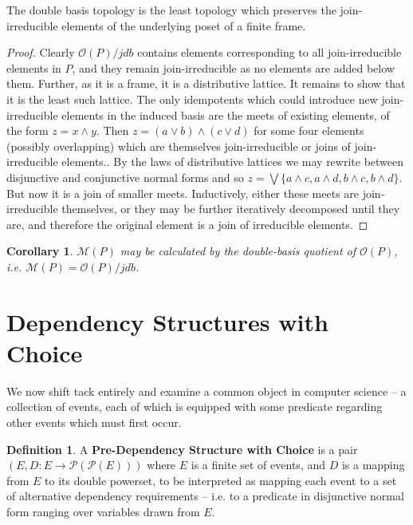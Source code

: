 \documentclass[hoptionsi,review,format=sigplan]{acmart}
\newtheorem*{corollary}{Corollary}
\theoremstyle{definition}
\newtheorem{definition}{Definition}[section]
\newcommand{\Mcc}{\mathcal{M}}
\newcommand{\Oc}{\mathcal{O}}
\newcommand{\Pc}{\mathcal{P}}
\begin{document}
\begin{theorem}
The double basis topology is the least topology which preserves the join-irreducible elements of the underlying poset of a finite frame.
\end{theorem}
\begin{proof}
Clearly \(\Oc(P)/jdb\) contains elements corresponding to all join-irreducible elements in \(P\), and they remain join-irreducible as no elements are added below them. Further, as it is a frame, it is a distributive lattice. It remains to show that it is the least such lattice. The only idempotents which could introduce new join-irreducible elements in the induced basis are the meets of existing elements, of the form  \(z = x \wedge y\). Then \(z = (a \vee b) \wedge (c \vee d)\) for some four elements (possibly overlapping) which are themselves join-irreducible or joins of join-irreducible elements..  By the laws of distributive lattices we may rewrite between disjunctive and conjunctive normal forms and so \(z = \bigvee \{a \wedge c, a \wedge d, b \wedge c, b \wedge d\}\).  But now it is a join of smaller meets. Inductively, either these meets are join-irreducible themselves, or they may be further iteratively decomposed until they are, and therefore the original element is a join of irreducible elements.
\end{proof}

\begin{corollary}
\(\Mcc(P)\) may be calculated by the double-basis quotient of \(\Oc(P)\), i.e. \(\Mcc(P) = \Oc(P)/jdb\).
\end{corollary}





\section{Dependency Structures with Choice}
We now shift tack entirely and examine a common object in computer science -- a collection of events, each of which is equipped with some predicate regarding other events which must first occur. 

\begin{definition}
A \textbf{Pre-Dependency Structure with Choice} is a pair \((E, D : E \rightarrow \Pc(\Pc(E)))\) where \(E\) is a finite set of events, and \(D\) is a mapping from \(E\) to its double powerset, to be interpreted as mapping each event to a set of alternative dependency requirements -- i.e. to a predicate in disjunctive normal form ranging over variables drawn from \(E\). 
\end{definition}
\end{document}

